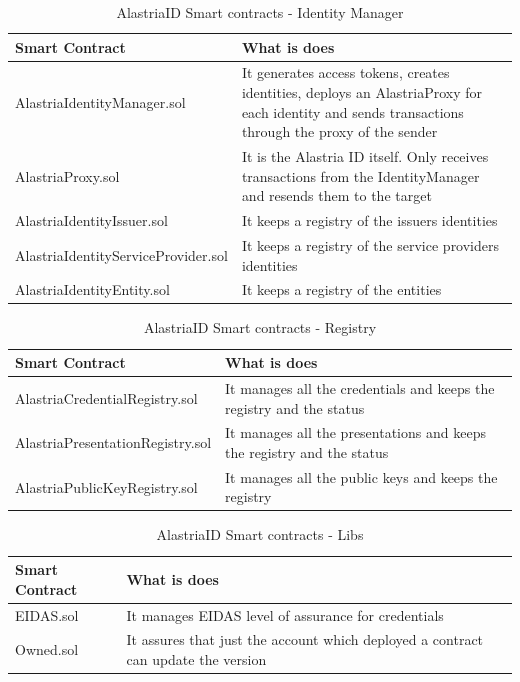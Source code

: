 \documentclass[target=mst,aauheader=]{thud}
\begin{document}
\begin{table}[h!]
    \begin{tabular}{|p{6cm}|p{12cm}|}
    \hline
    Smart Contract & What is does\\ [0.5ex] 
    \hline\hline
    AlastriaIdentityManager.sol	 & It generates access tokens, creates identities, deploys an AlastriaProxy for each identity and sends transactions through the proxy of the sender\\ 
    \hline
    AlastriaProxy.sol & It is the Alastria ID itself. Only receives transactions from the IdentityManager and resends them to the target \\ 
    \hline
    AlastriaIdentityIssuer.sol & It keeps a registry of the issuers identities \\
    \hline
    AlastriaIdentityServiceProvider.sol & It keeps a registry of the service providers identities \\
    \hline
    AlastriaIdentityEntity.sol & It keeps a registry of the entities \\
    \hline
    \end{tabular}
    \caption{AlastriaID Smart contracts - Identity Manager}
    \label{table:identityManager}

\end{table}

\begin{table}[h!]
    \begin{tabular}{|p{6cm}|p{12cm}|}
    \hline
    Smart Contract & What is does\\ [0.5ex] 
    \hline\hline
    AlastriaCredentialRegistry.sol & It manages all the credentials and keeps the registry and the status\\ 
    \hline
    AlastriaPresentationRegistry.sol & It manages all the presentations and keeps the registry and the status\\
    \hline
    AlastriaPublicKeyRegistry.sol & It manages all the public keys and keeps the registry \\
    \hline
    \end{tabular}
    \caption{AlastriaID Smart contracts - Registry}
    \label{table:registries}


\end{table}

\begin{table}[h!]
    \begin{tabular}{|p{6cm}|p{12cm}|}
    \hline
    Smart Contract & What is does\\ [0.5ex] 
    \hline\hline
    EIDAS.sol & It manages EIDAS level of assurance for credentials \\ 
    \hline
    Owned.sol & It assures that just the account which deployed a contract can update the version \\ 
    \hline
    \end{tabular}
    \caption{AlastriaID Smart contracts - Libs}
    \label{table:utilities}


\end{table}
\end{document}
